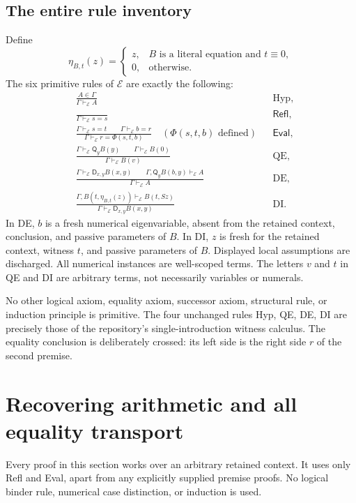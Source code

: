 \documentclass[11pt]{article}
\theoremstyle{definition}
\newcommand{\E}{\mathcal E}
\newcommand{\Q}{\mathsf Q}
\newcommand{\D}{\mathsf D}
\newcommand{\ev}{\mathsf{Eval}}
\newcommand{\refl}{\mathsf{Refl}}
\newcommand{\syn}{\equiv}
\newcommand{\prf}[2]{#1\vdash_{\E}#2}
\begin{document}
\subsection{The entire rule inventory}

Define
\[
 \eta_{B,t}(z)=
 \begin{cases}
 z,&B\text{ is a literal equation and }t\syn0,\\
 0,&\text{otherwise}.
 \end{cases}
\]
The six primitive rules of $\E$ are exactly the following:
\begin{align*}
&\frac{A\in\Gamma}{\prf{\Gamma}{A}}
&&\text{Hyp},\\[5pt]
&\frac{}{\prf{\Gamma}{s=s}}
&&\refl,\\[5pt]
&\frac{\prf{\Gamma}{s=t}\qquad\prf{\Gamma}{b=r}}
       {\prf{\Gamma}{r=\Phi(s,t,b)}}
\quad(\Phi(s,t,b)\text{ defined})
&&\ev,\\[5pt]
&\frac{\prf{\Gamma}{\Q_yB(y)}\qquad\prf{\Gamma}{B(0)}}
       {\prf{\Gamma}{B(v)}}
&&\text{QE},\\[5pt]
&\frac{\prf{\Gamma}{\D_{x,y}B(x,y)}\qquad
       \prf{\Gamma,\Q_yB(b,y)}{A}}
       {\prf{\Gamma}{A}}
&&\text{DE},\\[5pt]
&\frac{\prf{\Gamma,B(t,\eta_{B,t}(z))}{B(t,Sz)}}
       {\prf{\Gamma}{\D_{x,y}B(x,y)}}
&&\text{DI}.
\end{align*}
In DE, $b$ is a fresh numerical eigenvariable, absent from the retained
context, conclusion, and passive parameters of $B$. In DI, $z$ is fresh
for the retained context, witness $t$, and passive parameters of $B$.
Displayed local assumptions are discharged. All numerical instances are
well-scoped terms. The letters $v$ and $t$ in QE and DI are arbitrary
terms, not necessarily variables or numerals.

No other logical axiom, equality axiom, successor axiom, structural rule,
or induction principle is primitive. The four unchanged rules Hyp, QE,
DE, DI are precisely those of the repository's single-introduction
witness calculus. The equality conclusion is deliberately crossed:
its left side is the right side $r$ of the second premise.

\section{Recovering arithmetic and all equality transport}
\label{sec:bootstrap}

Every proof in this section works over an arbitrary retained context.
It uses only Refl and Eval, apart from any explicitly supplied premise
proofs. No logical binder rule, numerical case distinction, or induction
is used.
\end{document}
